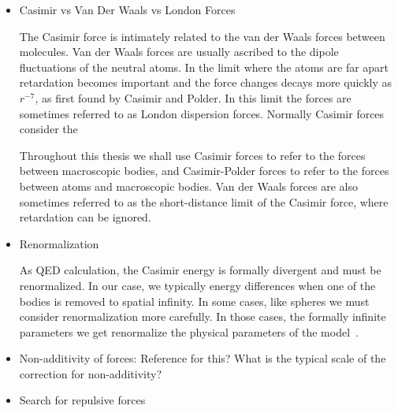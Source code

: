 \begin{itemize}
\item Casimir vs Van Der Waals vs London Forces

The Casimir force is intimately related to the van der Waals forces between molecules.
Van der Waals forces are usually ascribed to the dipole fluctuations of the 
neutral atoms.
In the limit where the atoms are far apart retardation becomes important and 
the force changes decays more quickly as $r^{-7}$, as first found by Casimir and Polder.  
In this limit the forces are sometimes referred to as London dispersion forces.
Normally Casimir forces consider the 

Throughout this thesis we shall use Casimir forces to refer to the forces between
macroscopic bodies, and Casimir-Polder forces to refer to the forces between 
atoms and macroscopic bodies.  Van der Waals forces are also sometimes referred to as the 
short-distance limit of the Casimir force, where retardation can be ignored.      

\item Renormalization

As QED calculation, the Casimir energy is formally divergent and must be renormalized. 
 In our case, we typically energy differences when one of the bodies is 
removed to spatial infinity.
  In some cases, like spheres we must consider renormalization more carefully.
  In those cases, the formally infinite parameters we get renormalize the 
physical parameters of the model~\cite{Milton2001}.  

\item Non-additivity of forces:  Reference for this?  What is the typical scale of the correction for non-additivity?

\item Search for repulsive forces


\end{itemize}
